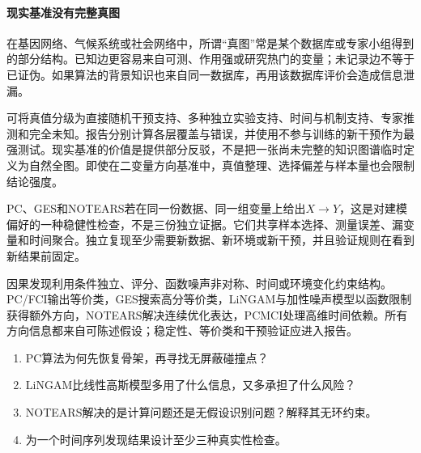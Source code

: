 \paragraph{现实基准没有完整真图}

在基因网络、气候系统或社会网络中，所谓“真图”常是某个数据库或专家小组得到的部分结构。已知边更容易来自可测、作用强或研究热门的变量；未记录边不等于已证伪。如果算法的背景知识也来自同一数据库，再用该数据库评价会造成信息泄漏。

可将真值分级为直接随机干预支持、多种独立实验支持、时间与机制支持、专家推测和完全未知。报告分别计算各层覆盖与错误，并使用不参与训练的新干预作为最强测试。现实基准的价值是提供部分反驳，不是把一张尚未完整的知识图谱临时定义为自然全图。即使在二变量方向基准中，真值整理、选择偏差与样本量也会限制结论强度\parencite{mooij2016}。

\begin{failurecheck}[多算法一致被当成独立复现]
PC、GES和NOTEARS若在同一份数据、同一组变量上给出$X\rightarrow Y$，这是对建模偏好的一种稳健性检查，不是三份独立证据。它们共享样本选择、测量误差、漏变量和时间聚合。独立复现至少需要新数据、新环境或新干预，并且验证规则在看到新结果前固定。
\end{failurecheck}

\begin{chapterreview}
因果发现利用条件独立、评分、函数噪声非对称、时间或环境变化约束结构。PC/FCI输出等价类，GES搜索高分等价类，LiNGAM与加性噪声模型以函数限制获得额外方向，NOTEARS解决连续优化表达，PCMCI处理高维时间依赖。所有方向信息都来自可陈述假设；稳定性、等价类和干预验证应进入报告。
\end{chapterreview}

\begin{selfcheck}
\begin{enumerate}
  \item PC算法为何先恢复骨架，再寻找无屏蔽碰撞点？
  \item LiNGAM比线性高斯模型多用了什么信息，又多承担了什么风险？
  \item NOTEARS解决的是计算问题还是无假设识别问题？解释其无环约束。
  \item 为一个时间序列发现结果设计至少三种真实性检查。
\end{enumerate}
\end{selfcheck}


